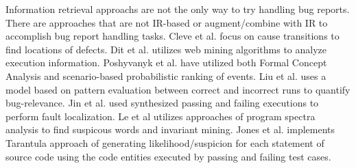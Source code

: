 Information retrieval approachs are not the only way to try handling bug reports.  There are approaches that are not IR-based or augment/combine with IR to accomplish bug report handling tasks.  Cleve et al. \cite{Cleve:2005:LCP:1062455.1062522} focus on cause transitions to find locations of defects.  Dit et al. \cite{Dit:2013:IIR:2436118.2436134} utilizes web mining algorithms to analyze execution information.  Poshyvanyk et al. \cite{Poshyvanyk:2013:CLU:2377656.2377660, Poshyvanyk:2007:FLU:1263152.1263534} have utilized both Formal Concept Analysis and scenario-based probabilistic ranking of events.  Liu et al. \cite{Liu:2005:SSM:1081706.1081753} uses a model based on pattern evaluation between correct and incorrect runs to quantify bug-relevance.  Jin et al. \cite{Jin:2013:FFL:2483760.2483763} used synthesized passing and failing executions to perform fault localization.  Le et al \cite{Le:2015:IRS:2786805.2786880, B.Le:2016:LBF:2931037.2931049} utilizes approaches of program spectra analysis to find suspicous words and invariant mining.  Jones et al. \cite{Jones:2005:EET:1101908.1101949} implements Tarantula approach of generating likelihood/suspicion for each statement of source code using the code entities executed by passing and failing test cases.


